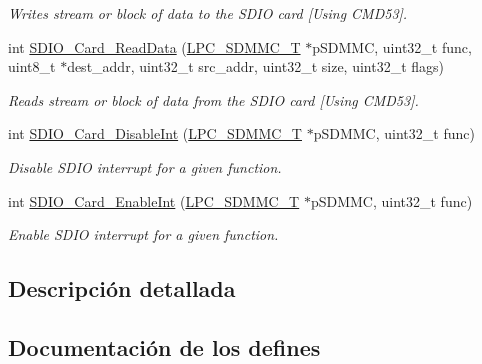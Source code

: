 \begin{DoxyCompactItemize}
\begin{DoxyCompactList}\small\item\em Writes stream or block of data to the S\+D\+IO card \mbox{[}Using C\+M\+D53\mbox{]}. \end{DoxyCompactList}\item 
int \hyperlink{group___s_d_i_o__18_x_x__43_x_x_ga340277ee179263511434895dd79fdd81}{S\+D\+I\+O\+\_\+\+Card\+\_\+\+Read\+Data} (\hyperlink{struct_l_p_c___s_d_m_m_c___t}{L\+P\+C\+\_\+\+S\+D\+M\+M\+C\+\_\+T} $\ast$p\+S\+D\+M\+MC, uint32\+\_\+t func, uint8\+\_\+t $\ast$dest\+\_\+addr, uint32\+\_\+t src\+\_\+addr, uint32\+\_\+t size, uint32\+\_\+t flags)
\begin{DoxyCompactList}\small\item\em Reads stream or block of data from the S\+D\+IO card \mbox{[}Using C\+M\+D53\mbox{]}. \end{DoxyCompactList}\item 
int \hyperlink{group___s_d_i_o__18_x_x__43_x_x_gad4d1162fa4a1e5b2b6c9835d20f28fed}{S\+D\+I\+O\+\_\+\+Card\+\_\+\+Disable\+Int} (\hyperlink{struct_l_p_c___s_d_m_m_c___t}{L\+P\+C\+\_\+\+S\+D\+M\+M\+C\+\_\+T} $\ast$p\+S\+D\+M\+MC, uint32\+\_\+t func)
\begin{DoxyCompactList}\small\item\em Disable S\+D\+IO interrupt for a given function. \end{DoxyCompactList}\item 
int \hyperlink{group___s_d_i_o__18_x_x__43_x_x_ga304515a4a0d3e71651e74bbdde07ba3f}{S\+D\+I\+O\+\_\+\+Card\+\_\+\+Enable\+Int} (\hyperlink{struct_l_p_c___s_d_m_m_c___t}{L\+P\+C\+\_\+\+S\+D\+M\+M\+C\+\_\+T} $\ast$p\+S\+D\+M\+MC, uint32\+\_\+t func)
\begin{DoxyCompactList}\small\item\em Enable S\+D\+IO interrupt for a given function. \end{DoxyCompactList}\end{DoxyCompactItemize}


\subsection{Descripción detallada}


\subsection{Documentación de los \textquotesingle{}defines\textquotesingle{}}
